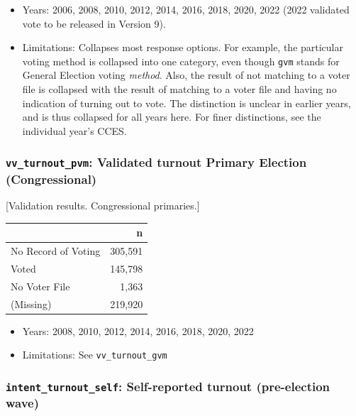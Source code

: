 \documentclass[10pt,article,oneside]{memoir}
\theoremstyle{definition}
\begin{document}
\begin{itemize}
\tightlist
\item
  Years: 2006, 2008, 2010, 2012, 2014, 2016, 2018, 2020, 2022 (2022
  validated vote to be released in Version 9).
\item
  Limitations: Collapses most response options. For example, the
  particular voting method is collapsed into one category, even though
  \texttt{gvm} stands for General Election voting \emph{method}. Also,
  the result of not matching to a voter file is collapsed with the
  result of matching to a voter file and having no indication of turning
  out to vote. The distinction is unclear in earlier years, and is thus
  collapsed for all years here. For finer distinctions, see the
  individual year's CCES.
\end{itemize}

\subsubsection{\texorpdfstring{\texttt{vv\_turnout\_pvm}: Validated
turnout Primary Election
(Congressional)}{vv\_turnout\_pvm: Validated turnout Primary Election (Congressional)}}\label{vv_turnout_pvm-validated-turnout-primary-election-congressional}

{[}Validation results. Congressional primaries.{]}

\begin{table}[H]
\centering
\begin{tabular}[t]{lr}
\toprule
 & n\\
\midrule
No Record of Voting & 305,591\\
Voted & 145,798\\
No Voter File & 1,363\\
(Missing) & 219,920\\
\bottomrule
\end{tabular}
\end{table}

\begin{itemize}
\tightlist
\item
  Years: 2008, 2010, 2012, 2014, 2016, 2018, 2020, 2022
\item
  Limitations: See \texttt{vv\_turnout\_gvm}
\end{itemize}

\subsubsection{\texorpdfstring{\texttt{intent\_turnout\_self}:
Self-reported turnout (pre-election
wave)}{intent\_turnout\_self: Self-reported turnout (pre-election wave)}}\label{intent_turnout_self-self-reported-turnout-pre-election-wave}
\end{document}
